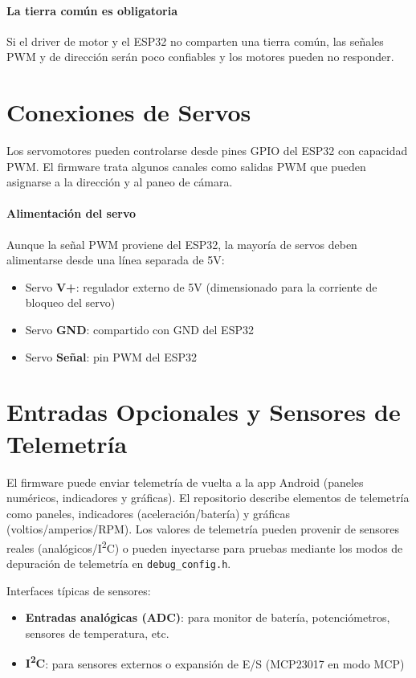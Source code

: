 \paragraph{La tierra común es obligatoria}
Si el driver de motor y el ESP32 no comparten una tierra común, las señales PWM y de dirección serán poco confiables
y los motores pueden no responder.

\section{Conexiones de Servos}
\label{sec:hw-servos}

Los servomotores pueden controlarse desde pines GPIO del ESP32 con capacidad PWM. El firmware trata algunos canales como
salidas PWM que pueden asignarse a la dirección y al paneo de cámara.

\paragraph{Alimentación del servo}
Aunque la señal PWM proviene del ESP32, la mayoría de servos deben alimentarse desde una línea separada de 5V:
\begin{itemize}
    \item Servo \textbf{V+}: regulador externo de 5V (dimensionado para la corriente de bloqueo del servo)
    \item Servo \textbf{GND}: compartido con GND del ESP32
    \item Servo \textbf{Señal}: pin PWM del ESP32
\end{itemize}

\section{Entradas Opcionales y Sensores de Telemetría}
\label{sec:hw-telemetry-inputs}

El firmware puede enviar telemetría de vuelta a la app Android (paneles numéricos, indicadores y gráficas). El repositorio
describe elementos de telemetría como paneles, indicadores (aceleración/batería) y gráficas (voltios/amperios/RPM). Los valores
de telemetría pueden provenir de sensores reales (analógicos/I\textsuperscript{2}C) o pueden inyectarse para pruebas mediante los
modos de depuración de telemetría en \texttt{debug\_config.h}.

Interfaces típicas de sensores:
\begin{itemize}
    \item \textbf{Entradas analógicas (ADC)}: para monitor de batería, potenciómetros, sensores de temperatura, etc.
    \item \textbf{I\textsuperscript{2}C}: para sensores externos o expansión de E/S (MCP23017 en modo MCP)
\end{itemize}

